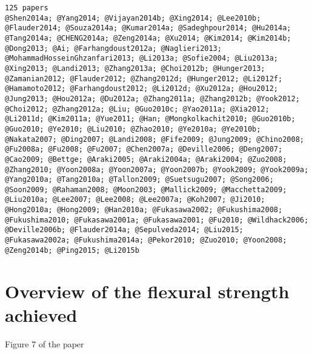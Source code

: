 \documentclass[11pt]{article}
\begin{document}
    \begin{Verbatim}[commandchars=\\\{\}]
125 papers
@Shen2014a; @Yang2014; @Vijayan2014b; @Xing2014; @Lee2010b; @Flauder2014; @Souza2014a; @Kumar2014a; @Sadeghpour2014; @Hu2014a; @Tang2014a; @CHENG2014a; @Zeng2014a; @Xu2014; @Kim2014; @Kim2014b; @Dong2013; @Ai; @Farhangdoust2012a; @Naglieri2013; @MohammadHosseinGhzanfari2013; @Li2013a; @Sofie2004; @Liu2013a; @Xing2013; @Landi2013; @Zhang2013a; @Choi2012b; @Hunger2013; @Zamanian2012; @Flauder2012; @Zhang2012d; @Hunger2012; @Li2012f; @Hamamoto2012; @Farhangdoust2012; @Li2012d; @Xu2012a; @Hou2012; @Jung2013; @Hou2012a; @Du2012a; @Zhang2011a; @Zhang2012b; @Yook2012; @Choi2012; @Zhang2012a; @Liu; @Guo2010c; @Yao2011a; @Xia2012; @Li2011d; @Kim2011a; @Yue2011; @Han; @Mongkolkachit2010; @Guo2010b; @Guo2010; @Ye2010; @Liu2010; @Zhao2010; @Ye2010a; @Ye2010b; @Nakata2007; @Ding2007; @Landi2008; @Fife2009; @Jung2009; @Chino2008; @Fu2008a; @Fu2008; @Fu2007; @Chen2007a; @Deville2006; @Deng2007; @Cao2009; @Bettge; @Araki2005; @Araki2004a; @Araki2004; @Zuo2008; @Zhang2010; @Yoon2008a; @Yoon2007a; @Yoon2007b; @Yook2009; @Yook2009a; @Yang2010a; @Tang2010a; @Tallon2009; @Suetsugu2007; @Song2006; @Soon2009; @Rahaman2008; @Moon2003; @Mallick2009; @Macchetta2009; @Liu2010a; @Lee2007; @Lee2008; @Lee2007a; @Koh2007; @Ji2010; @Hong2010a; @Hong2009; @Han2010a; @Fukasawa2002; @Fukushima2008; @Fukushima2010; @Fukasawa2001a; @Fukasawa2001; @Fu2010; @Wildhack2006; @Deville2006b; @Flauder2014a; @Sepulveda2014; @Liu2015; @Fukasawa2002a; @Fukushima2014a; @Pekor2010; @Zuo2010; @Yoon2008; @Zeng2014b; @Ping2015; @Li2015b

    \end{Verbatim}

    \hypertarget{overview-of-the-flexural-strength-achieved}{%
\section{Overview of the flexural strength
achieved}\label{overview-of-the-flexural-strength-achieved}}

Figure 7 of the paper
\end{document}
